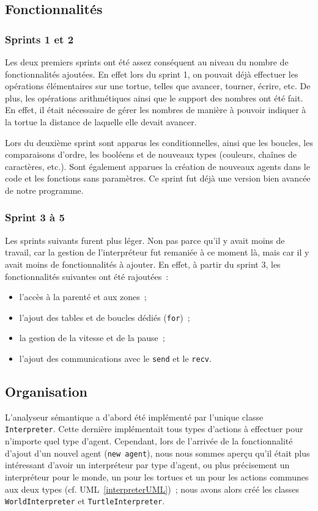 \subsection{Fonctionnalités}

\subsubsection{Sprints 1 et 2}
Les deux premiers sprints ont été assez conséquent au niveau du nombre de fonctionnalités ajoutées.
En effet lors du sprint 1, on pouvait déjà effectuer les opérations élémentaires sur une tortue, telles que avancer, tourner, écrire, etc. De plus, les opérations arithmétiques ainsi que le support des nombres ont été fait. En effet, il était nécessaire de gérer les nombres de manière à pouvoir indiquer à la tortue la distance de laquelle elle devait avancer.

Lors du deuxième sprint sont apparus les conditionnelles, ainsi que les boucles, les comparaisons d'ordre, les booléens et de nouveaux types (couleurs, chaînes de caractères, etc.). Sont également apparues la création de nouveaux agents dans le code et les fonctions sans paramètres. Ce sprint fut déjà une version bien avancée de notre programme.

\subsubsection{Sprint 3 à 5}
Les sprints suivants furent plus léger. Non pas parce qu'il y avait moins de travail, car la gestion de l'interpréteur fut remaniée à ce moment là, mais car il y avait moins de fonctionnalités à ajouter. En effet, à partir du sprint 3, les fonctionnalités suivantes ont été rajoutées~:
\begin{itemize}
\item l'accès à la parenté et aux zones~;
\item l'ajout des tables et de boucles dédiés (\verb|for|)~;
\item la gestion de la vitesse et de la pause~;
\item l'ajout des communications avec le \verb|send| et le \verb|recv|.
\end{itemize}

\subsection{Organisation}

L'analyseur sémantique a d'abord été implémenté par l'unique classe \verb|Interpreter|.
Cette dernière implémentait tous types d'actions à effectuer pour n'importe quel type d'agent.
Cependant, lors de l'arrivée de la fonctionnalité d'ajout d'un nouvel agent (\verb|new agent|), nous nous sommes aperçu qu'il était plus intéressant d'avoir un interpréteur par type d'agent, ou plus précisement un interpréteur pour le monde, un pour les tortues et un pour les actions communes aux deux types (cf. UML~\ref{interpreterUML})~; nous avons alors créé les classes \verb|WorldInterpreter| et \verb|TurtleInterpreter|.


